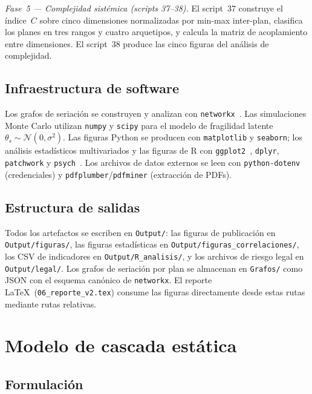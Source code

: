 \documentclass[11pt,letterpaper]{article}
\begin{document}
\textit{Fase~5 --- Complejidad sistémica (scripts 37--38).}
El script~37 construye el índice~$C$ sobre cinco dimensiones normalizadas
por min-max inter-plan, clasifica los planes en tres rangos y cuatro
arquetipos, y calcula la matriz de acoplamiento entre dimensiones.
El script~38 produce las cinco figuras del análisis de complejidad.

\subsection{Infraestructura de software}

Los grafos de seriación se construyen y analizan con
\texttt{networkx}~\cite{Hagberg2008}.
Las simulaciones Monte Carlo utilizan \texttt{numpy} y \texttt{scipy}
para el modelo de fragilidad latente~$\theta_s\sim\mathcal{N}(0,\sigma^2)$.
Las figuras Python se producen con \texttt{matplotlib} y
\texttt{seaborn}; los análisis estadísticos multivariados y las figuras
de R con \texttt{ggplot2}~\cite{Wickham2016}, \texttt{dplyr},
\texttt{patchwork} y \texttt{psych}~\cite{Revelle2024}.
Los archivos de datos externos se leen con \texttt{python-dotenv}
(credenciales) y \texttt{pdfplumber}/\texttt{pdfminer} (extracción de PDFs).

\subsection{Estructura de salidas}

Todos los artefactos se escriben en \texttt{Output/}:
las figuras de publicación en \texttt{Output/figuras/},
las figuras estadísticas en \texttt{Output/figuras\_correlaciones/},
los CSV de indicadores en \texttt{Output/R\_analisis/},
y los archivos de riesgo legal en \texttt{Output/legal/}.
Los grafos de seriación por plan se almacenan en \texttt{Grafos/} como
JSON con el esquema canónico de \texttt{networkx}.
El reporte \LaTeX\ (\texttt{06\_reporte\_v2.tex}) consume las figuras
directamente desde estas rutas mediante rutas relativas.

\section{Modelo de cascada estática}
\label{sec:cascada}

\subsection{Formulación}
\end{document}
